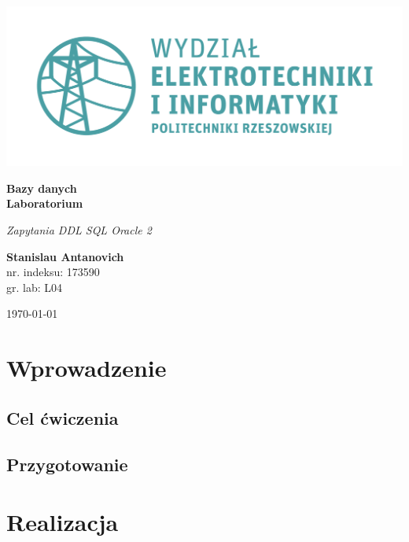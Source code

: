 \documentclass{article}
\begin{document}
\begin{titlepage}
\begin{center}
	\includegraphics[scale=0.7]{logo.png}

	\vspace*{4cm}
	\textbf{Bazy danych\\ Laboratorium}

	\vspace{1.5cm}
	\textit{Zapytania DDL SQL Oracle 2}

	\vspace{1.5cm}
	\textbf{Stanislau Antanovich}\\
	nr. indeksu: 173590\\
	gr. lab: L04

	\vspace{4.5cm}
	\today
\end{center}
\end{titlepage}

\tableofcontents
\listoffigures
\lstlistoflistings

\newpage
 
\section{Wprowadzenie}

\subsection{Cel ćwiczenia}

\subsection{Przygotowanie}

\section{Realizacja}
\end{document}
